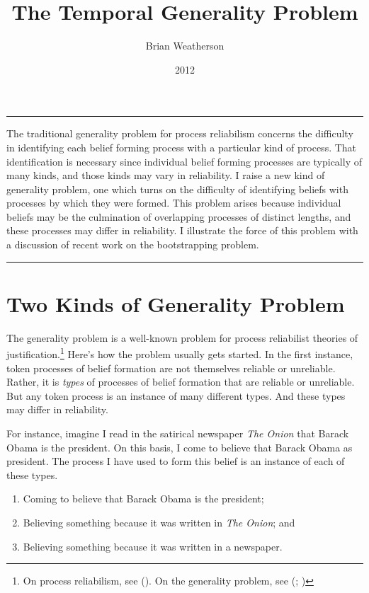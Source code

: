\documentclass[
  10pt,
  letterpaper,
  DIV=11,
  numbers=noendperiod,
  twoside]{scrartcl}
\title{The Temporal Generality Problem}
\author{Brian Weatherson}
\date{2012}
\providecommand{\tightlist}{%
  \setlength{\itemsep}{0pt}\setlength{\parskip}{0pt}}\usepackage{longtable,booktabs,array}
\renewenvironment{abstract}
 {\vspace{-1.25cm}
 \quotation\small\noindent\rule{\linewidth}{.5pt}\par\smallskip
 \noindent }
 {\par\noindent\rule{\linewidth}{.5pt}\endquotation}
\begin{document}
\maketitle
\begin{abstract}
The traditional generality problem for process reliabilism concerns the
difficulty in identifying each belief forming process with a particular
kind of process. That identification is necessary since individual
belief forming processes are typically of many kinds, and those kinds
may vary in reliability. I raise a new kind of generality problem, one
which turns on the difficulty of identifying beliefs with processes by
which they were formed. This problem arises because individual beliefs
may be the culmination of overlapping processes of distinct lengths, and
these processes may differ in reliability. I illustrate the force of
this problem with a discussion of recent work on the bootstrapping
problem.
\end{abstract}

\section{Two Kinds of Generality
Problem}\label{two-kinds-of-generality-problem}

The generality problem is a well-known problem for process reliabilist
theories of justification.\footnote{On process reliabilism, see
  (). On the generality problem,
  see (;
  )} Here's how
the problem usually gets started. In the first instance, token processes
of belief formation are not themselves reliable or unreliable. Rather,
it is \emph{types} of processes of belief formation that are reliable or
unreliable. But any token process is an instance of many different
types. And these types may differ in reliability.

For instance, imagine I read in the satirical newspaper \emph{The Onion}
that Barack Obama is the president. On this basis, I come to believe
that Barack Obama as president. The process I have used to form this
belief is an instance of each of these types.

\begin{enumerate}
\def\labelenumi{\arabic{enumi}.}
\tightlist
\item
  Coming to believe that Barack Obama is the president;
\item
  Believing something because it was written in \emph{The Onion}; and
\item
  Believing something because it was written in a newspaper.
\end{enumerate}
\end{document}
